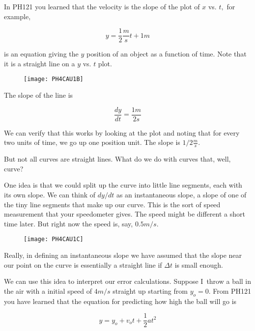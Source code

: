 In PH121 you learned that the velocity is the slope of the plot of $x$ vs. $t,$ for example, 

\begin{equation*}
	y=\frac{1}{2}\frac{\unit{m}}{\unit{s}}t+1\unit{m}
\end{equation*}

is an equation giving the $y$ position of an object as a function of time. Note that it is a straight line on a $y$ vs. $t$ plot. 

\begin{figure}[h!]
	\centering
    \texttt{[image: PH4CAU1B]}
\end{figure}

The slope of the line is 

\begin{equation*}
	\frac{dy}{dt}=\frac{1\unit{m}}{2\unit{s}}
\end{equation*}

We can verify that this works by looking at the plot and noting that for every two units of time, we go up one position unit. The slope is $1/2\frac{\unit{m}}{\unit{s}}.$

But not all curves are straight lines. What do we do with curves that, well, curve?

One idea is that we could split up the curve into little line segments, each with its own slope. We can think of $dy/dt$ as an instantaneous slope, a slope of one of the tiny line segments that make up our curve. This is the sort of speed measurement that your speedometer gives. The speed might be different a short time later. But right now the speed is, say, $0.5\unit{m}/ \unit{s}.$

\begin{figure}[h!]
	\centering
    \texttt{[image: PH4CAU1C]}
\end{figure}

Really, in defining an instantaneous slope we have assumed that the slope near our point on the
curve is essentially a straight line if $\Delta t$ is small enough.

We can use this idea to interpret our error calculations. Suppose I\ throw a ball in the air with a initial speed of $4\unit{m}/\unit{s}$ straight up starting from $y_{o}=0$. From PH121 you have learned that the equation for predicting how high the ball will go is 

\begin{equation*}
	y=y_{o}+v_{o}t+\frac{1}{2}at^{2}
\end{equation*}

